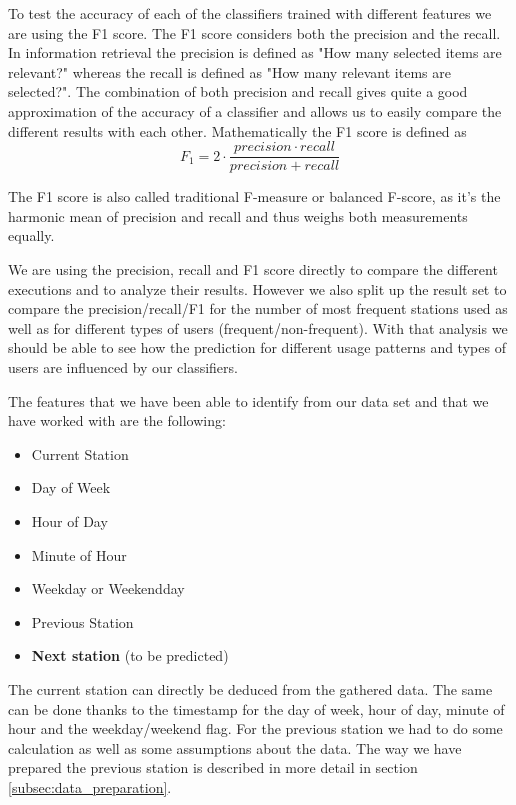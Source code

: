 To test the accuracy of each of the classifiers trained with different features we are using the F1 score. The F1 score considers both the precision and the recall. In information retrieval the precision is defined as "How many selected items are relevant?" whereas the recall is defined as "How many relevant items are selected?". The combination of both precision and recall gives quite a good approximation of the accuracy of a classifier and allows us to easily compare the different results with each other. Mathematically the F1 score is defined as 
\begin{equation}\label{equation:F1Score}
F_{1} = 2 \cdot \frac{precision \cdot recall}{precision + recall}
\end{equation}

The F1 score is also called traditional F-measure or balanced F-score, as it's the harmonic mean of precision and recall and thus weighs both measurements equally.

We are using the precision, recall and F1 score directly to compare the different executions and to analyze their results. However we also split up the result set to compare the precision/recall/F1 for the number of most frequent stations used as well as for different types of users (frequent/non-frequent). With that analysis we should be able to see how the prediction for different usage patterns and types of users are influenced by our classifiers.

The features that we have been able to identify from our data set and that we have worked with are the following:
\begin{itemize}
	\item Current Station
	\item Day of Week
	\item Hour of Day
	\item Minute of Hour
	\item Weekday or Weekendday
	\item Previous Station
	\item \textbf{Next station} (to be predicted)
\end{itemize}

The current station can directly be deduced from the gathered data. The same can be done thanks to the timestamp for the day of week, hour of day, minute of hour and the weekday/weekend flag. For the previous station we had to do some calculation as well as some assumptions about the data. The way we have prepared the previous station is described in more detail in section \ref{subsec:data_preparation}.  


